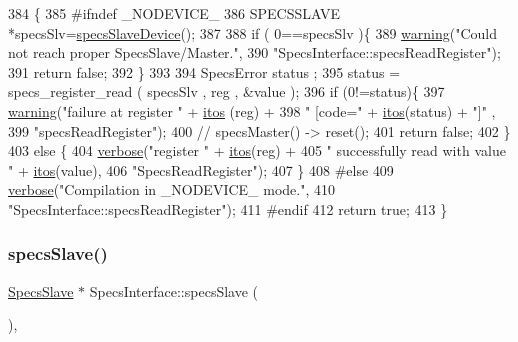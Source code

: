 \begin{DoxyCode}
384                                                  \{
385 \textcolor{preprocessor}{#ifndef \_NODEVICE\_
}
386   SPECSSLAVE *specsSlv=\hyperlink{classSpecsInterface_ac8d4711197f484f055533ec1e5ae01a1}{specsSlaveDevice}();
387 
388   \textcolor{keywordflow}{if} ( 0==specsSlv  )\{
389     \hyperlink{classObject_a65cd4fda577711660821fd2cd5a3b4c9}{warning}(\textcolor{stringliteral}{"Could not reach proper SpecsSlave/Master."},
390             \textcolor{stringliteral}{"SpecsInterface::specsReadRegister"});
391     \textcolor{keywordflow}{return} \textcolor{keyword}{false};
392   \}
393   
394   SpecsError status ;
395   status = specs\_register\_read ( specsSlv , reg , &value );
396   \textcolor{keywordflow}{if} (0!=status)\{
397     \hyperlink{classObject_a65cd4fda577711660821fd2cd5a3b4c9}{warning}(\textcolor{stringliteral}{"failure at register "} + \hyperlink{Tools_8h_af330027dbdafb9a30768b3613c553e60}{itos} (reg) +
398             \textcolor{stringliteral}{" [code="} + \hyperlink{Tools_8h_af330027dbdafb9a30768b3613c553e60}{itos}(status) + \textcolor{stringliteral}{"]"} ,
399             \textcolor{stringliteral}{"specsReadRegister"});
400     \textcolor{comment}{//    specsMaster() -> reset();}
401     \textcolor{keywordflow}{return} \textcolor{keyword}{false};
402   \}
403   \textcolor{keywordflow}{else} \{
404     \hyperlink{classObject_a83d2db2df682907ea1115ad721c1c4a1}{verbose}(\textcolor{stringliteral}{"register "} + \hyperlink{Tools_8h_af330027dbdafb9a30768b3613c553e60}{itos}(reg) +
405             \textcolor{stringliteral}{" successfully read with value "} + \hyperlink{Tools_8h_af330027dbdafb9a30768b3613c553e60}{itos}(value),
406             \textcolor{stringliteral}{"SpecsReadRegister"});
407   \}
408 \textcolor{preprocessor}{#else
}
409   \hyperlink{classObject_a83d2db2df682907ea1115ad721c1c4a1}{verbose}(\textcolor{stringliteral}{"Compilation in \_NODEVICE\_ mode."},
410           \textcolor{stringliteral}{"SpecsInterface::specsReadRegister"});
411 \textcolor{preprocessor}{#endif
}
412   \textcolor{keywordflow}{return} \textcolor{keyword}{true};
413 \}
\end{DoxyCode}
\mbox{\label{classSpecsInterface_a13cf39bddfa8ba21d6e6aa78e78f0e4f}} 
\subsubsection{\texorpdfstring{specs\+Slave()}{specsSlave()}}
{\footnotesize\ttfamily \hyperlink{classSpecsSlave}{Specs\+Slave} $\ast$ Specs\+Interface\+::specs\+Slave (\begin{DoxyParamCaption}{ }\end{DoxyParamCaption})\hspace{0.3cm}{\ttfamily [virtual]}, {\ttfamily [inherited]}}

